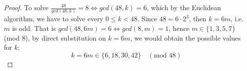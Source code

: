 \begin{assignment}[
  header=HeaderA,
  body=BodyA,
  title={Homework 2},
  duedate={17-February-2026},
  toc=false,
  toctitle={This appears on the Table of contents.},
  exlist=false
]
\begin{exer}[Problem 4.77]
\begin{itemize}
\begin{proof}
    To solve $\frac{48}{gcd(48,k)} = 8 \iff gcd(48,k) = 6$, which by the Euclidean algorithm, we have to solve every $0 \leq k < 48$. Since $48 = 6\cdot 2^3$, then $k = 6m$, i.e. $m$ is odd. That is $gcd(48, 6m) = 6 \iff gcd(8,m) = 1$,  hence $m \in \{1,3,5,7\}$ (mod $8$), by direct substitution on $k=6m$, we would obtain the possible values for $k$:
    \[
    k = 6m \in \{6,18,30,42\} \quad (\text{mod } 48)
    \]    
    \end{proof}
\end{itemize}    
\end{exer}




\end{assignment}